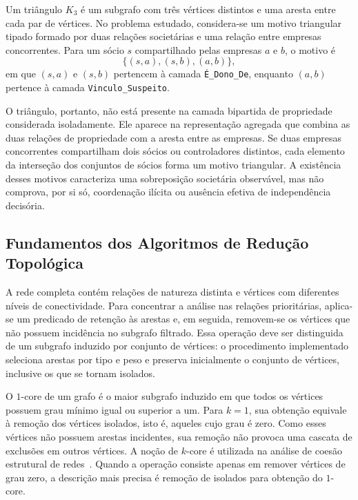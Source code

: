 Um triângulo $K_3$ é um subgrafo com três vértices distintos e uma aresta entre cada par de vértices. No problema estudado, considera-se um motivo triangular tipado formado por duas relações societárias e uma relação entre empresas concorrentes. Para um sócio $s$ compartilhado pelas empresas $a$ e $b$, o motivo é
\begin{equation}
  \{(s,a),(s,b),(a,b)\},
  \label{eq:motivo_triangular}
\end{equation}
em que $(s,a)$ e $(s,b)$ pertencem à camada \texttt{É\_Dono\_De}, enquanto $(a,b)$ pertence à camada \texttt{Vinculo\_Suspeito}.

O triângulo, portanto, não está presente na camada bipartida de propriedade considerada isoladamente. Ele aparece na representação agregada que combina as duas relações de propriedade com a aresta entre as empresas. Se duas empresas concorrentes compartilham dois sócios ou controladores distintos, cada elemento da interseção dos conjuntos de sócios forma um motivo triangular. A existência desses motivos caracteriza uma sobreposição societária observável, mas não comprova, por si só, coordenação ilícita ou ausência efetiva de independência decisória.

\subsection{Fundamentos dos Algoritmos de Redução Topológica}

A rede completa contém relações de natureza distinta e vértices com diferentes níveis de conectividade. Para concentrar a análise nas relações prioritárias, aplica-se um predicado de retenção às arestas e, em seguida, removem-se os vértices que não possuem incidência no subgrafo filtrado. Essa operação deve ser distinguida de um subgrafo induzido por conjunto de vértices: o procedimento implementado seleciona arestas por tipo e peso e preserva inicialmente o conjunto de vértices, inclusive os que se tornam isolados.

O $1$-core de um grafo é o maior subgrafo induzido em que todos os vértices possuem grau mínimo igual ou superior a um. Para $k=1$, sua obtenção equivale à remoção dos vértices isolados, isto é, aqueles cujo grau é zero. Como esses vértices não possuem arestas incidentes, sua remoção não provoca uma cascata de exclusões em outros vértices. A noção de $k$-core é utilizada na análise de coesão estrutural de redes~\cite{seidman1983network}. Quando a operação consiste apenas em remover vértices de grau zero, a descrição mais precisa é remoção de isolados para obtenção do $1$-core.

